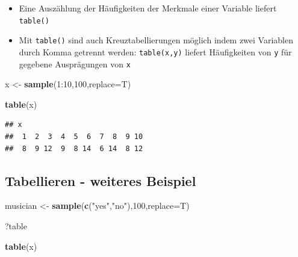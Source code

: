 \documentclass[]{article}
\newenvironment{Shaded}{\begin{snugshade}}{\end{snugshade}}
\newcommand{\KeywordTok}[1]{\textcolor[rgb]{0.13,0.29,0.53}{\textbf{{#1}}}}
\newcommand{\DataTypeTok}[1]{\textcolor[rgb]{0.13,0.29,0.53}{{#1}}}
\newcommand{\DecValTok}[1]{\textcolor[rgb]{0.00,0.00,0.81}{{#1}}}
\newcommand{\StringTok}[1]{\textcolor[rgb]{0.31,0.60,0.02}{{#1}}}
\newcommand{\NormalTok}[1]{{#1}}
\providecommand{\tightlist}{%
  \setlength{\itemsep}{0pt}\setlength{\parskip}{0pt}}
\begin{document}
\begin{itemize}
\tightlist
\item
  Eine Auszählung der Häufigkeiten der Merkmale einer Variable liefert
  \texttt{table()}
\item
  Mit \texttt{table()} sind auch Kreuztabellierungen möglich indem zwei
  Variablen durch Komma getrennt werden: \texttt{table(x,y)} liefert
  Häufigkeiten von \texttt{y} für gegebene Ausprägungen von \texttt{x}
\end{itemize}

\begin{Shaded}
\begin{Highlighting}[]
\NormalTok{x <-}\StringTok{ }\KeywordTok{sample}\NormalTok{(}\DecValTok{1}\NormalTok{:}\DecValTok{10}\NormalTok{,}\DecValTok{100}\NormalTok{,}\DataTypeTok{replace=}\NormalTok{T)}

\KeywordTok{table}\NormalTok{(x)}
\end{Highlighting}
\end{Shaded}

\begin{verbatim}
## x
##  1  2  3  4  5  6  7  8  9 10 
##  8  9 12  9  8 14  6 14  8 12
\end{verbatim}

\subsection{Tabellieren - weiteres
Beispiel}\label{tabellieren---weiteres-beispiel}

\begin{Shaded}
\begin{Highlighting}[]
\NormalTok{musician <-}\StringTok{ }\KeywordTok{sample}\NormalTok{(}\KeywordTok{c}\NormalTok{(}\StringTok{"yes"}\NormalTok{,}\StringTok{"no"}\NormalTok{),}\DecValTok{100}\NormalTok{,}\DataTypeTok{replace=}\NormalTok{T)}
\end{Highlighting}
\end{Shaded}

\begin{Shaded}
\begin{Highlighting}[]
\NormalTok{?table}
\end{Highlighting}
\end{Shaded}

\begin{Shaded}
\begin{Highlighting}[]
\KeywordTok{table}\NormalTok{(x)}
\end{Highlighting}
\end{Shaded}
\end{document}

